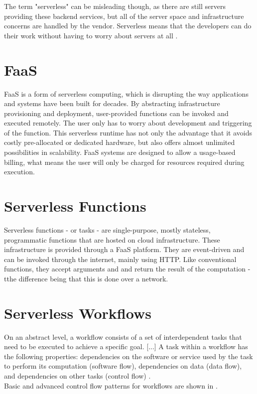 \documentclass[a4paper,top=25mm,bottom=25mm,12pt,pdftex,halfparskip,twoside,bibtotoc,numbers=noenddot]{scrbook}
\begin{document}
The term "serverless" can be misleading though, as there are still servers providing these backend services, but all of the server space and infrastructure concerns are handled by the vendor. Serverless means that the developers can do their work without having to worry about servers at all \cite{online-what-is-serverless-cloudflare}.

\section{FaaS}

FaaS is a form of serverless computing, which is disrupting the way applications and systems have been built for decades. By abstracting infrastructure provisioning and deployment, user-provided functions can be invoked and executed remotely. The user only has to worry about development and triggering of the function. This serverless runtime has not only the advantage that it avoids costly pre-allocated or dedicated hardware, but also offers almost unlimited possibilities in scalability. FaaS systems are designed to allow a usage-based billing, what means the user will only be charged for resources required during execution.

\section{Serverless Functions}
Serverless functions - or tasks - are single-purpose, mostly stateless, programmatic functions that are hosted on cloud infrastructure. These  infrastructure is provided through a FaaS platform. They are event-driven and can be invoked through the internet, mainly using HTTP. Like conventional functions, they accept arguments and and return the result of the computation  - tthe difference being that this is done over a network.

\section{Serverless Workflows}
On an abstract level, a workflow consists of a set of interdependent tasks that need to be executed to achieve a specific goal. [...] A task within a workflow has the following properties: dependencies on the software or service used by the task to perform its computation (software flow), dependencies on data (data flow), and dependencies on other tasks (control flow) \cite{thesis-design-serverless-worfklow-system-eyk}.\\
Basic and advanced control flow patterns for workflows are shown in \cite{reports-workflow-control-patterns-russell}.
\end{document}
